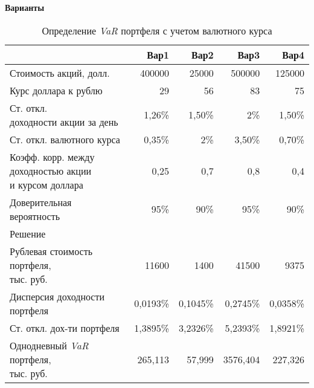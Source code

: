 \documentclass[12pt,a4paper]{article}
\begin{document}
\begin{taskrus}
\textbf{Варианты}
\begin{table}[H]
  \centering
  \caption{Определение \textit{VaR }портфеля с учетом валютного курса
}
    \begin{tabular}{lrrrr}
    \toprule
          & Вар1  & Вар2  & Вар3  & Вар4 \\
    \midrule
    Стоимость акций, долл. & 400000 & 25000 & 500000 & 125000 \\
    Курс доллара к рублю & 29    & 56    & 83    & 75 \\
    \specialcell{Ст. откл.\\
    доходности акции за день }& 1,26\% & 1,50\% & 2\%   & 1,50\% \\
    Ст. откл. валютного курса & 0,35\% & 2\%   & 3,50\% & 0,70\% \\
    \specialcell{Коэфф. корр. между\\
    доходностью акции\\и курсом доллара} & 0,25  & 0,7   & 0,8   & 0,4 \\
    Доверительная вероятность & 95\%  & 90\%  & 95\%  & 90\% \\
    Решение &       &       &       &  \\
    \specialcell{Рублевая стоимость портфеля,\\тыс. руб.} & 11600 & 1400  & 41500 & 9375 \\
    Дисперсия доходности портфеля & 0,0193\% & 0,1045\% & 0,2745\% & 0,0358\% \\
    Ст. откл. дох-ти портфеля & 1,3895\% & 3,2326\% & 5,2393\% & 1,8921\% \\
    \specialcell{Однодневный \textit{VaR }портфеля,\\тыс. руб.} & 265,113 & 57,999 & 3576,404 & 227,326 \\
    \bottomrule
    \end{tabular}%
  \label{tab:addlabel}%
\end{table}%


\end{taskrus}
\end{document}

